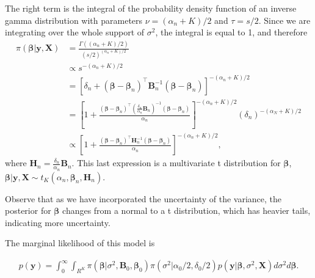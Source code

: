 The right term is the integral of the probability density function of an inverse gamma distribution with parameters $\nu = (\alpha_n+K)/2$ and $\tau = s/2$. Since we are integrating over the whole support of $\sigma^2$, the integral is equal to 1, and therefore
\begin{align*}
	\pi(\bm{\beta}|{\bm{y}},{\bm{X}}) & = \frac{\Gamma((\alpha_n+K)/2)}{(s/2)^{(\alpha_n+K)/2}} \\
	& \propto s^{-(\alpha_n+K)/2} \\
	& = [\delta_n + (\bm{\beta} - \bm{\beta}_n)^{\top}{{\bm{B}}}_n^{-1}(\bm{\beta} - \bm{\beta}_n)]^{-(\alpha_n+K)/2} \\
	& = \left[1 + \frac{(\bm{\beta} - \bm{\beta}_n)^{\top}\left(\frac{\delta_n}{\alpha_n}{{\bm{B}}}_n\right)^{-1}(\bm{\beta} - \bm{\beta}_n)}{\alpha_n}\right]^{-(\alpha_n+K)/2}(\delta_n)^{-(\alpha_N+K)/2} \\
	& \propto \left[1 + \frac{(\bm{\beta} - \bm{\beta}_n)^{\top}{\bm{H}}_n^{-1}(\bm{\beta} - \bm{\beta}_n)}{\alpha_n}\right]^{-(\alpha_n+K)/2},
\end{align*}
where ${\bm{H}}_n = \frac{\delta_n}{\alpha_n}{\bm{B}}_n$. This last expression is a multivariate t distribution for $\bm{\beta}$, $\bm{\beta}|{\bm{y}},{\bm{X}} \sim t_K(\alpha_n, \bm{\beta}_n, {\bm{H}}_n)$.

Observe that as we have incorporated the uncertainty of the variance, the posterior for $\bm{\beta}$ changes from a normal to a t distribution, which has heavier tails, indicating more uncertainty. 

The marginal likelihood of this model is

\begin{align*}
	p({\bm{y}})=\int_0^{\infty}\int_{R^K}\pi (\bm{\beta} | \sigma^2,{\bm{B}}_0,\bm{\beta}_0 )\pi(\sigma^2| \alpha_0/2, \delta_0/2)p({\bm{y}}|\bm{\beta}, \sigma^2, {\bm{X}})d\sigma^2 d\bm{\beta}.
\end{align*}

